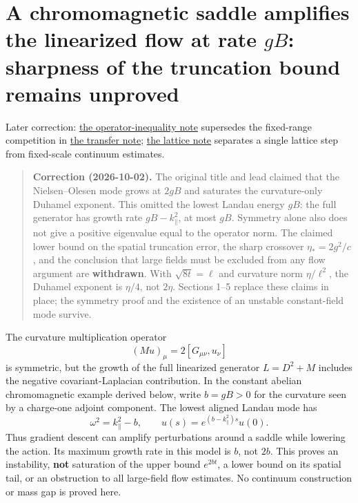 \documentclass[11pt,a4paper]{article}
\begin{document}
\section{\texorpdfstring{A chromomagnetic saddle amplifies the
linearized flow at rate \(gB\): sharpness of the truncation bound
remains
unproved}{A chromomagnetic saddle amplifies the linearized flow at rate gB: sharpness of the truncation bound remains unproved}}\label{a-chromomagnetic-saddle-amplifies-the-linearized-flow-at-rate-gb-sharpness-of-the-truncation-bound-remains-unproved}

Later correction: \href{large-field-operator-inequality.md}{the
operator-inequality note} supersedes the fixed-range competition in
\href{ground-state-measure-transfer.md}{the transfer note};
\href{flow-conjugation-truncation.md}{the lattice note} separates a
single lattice step from fixed-scale continuum estimates.

\begin{quote}
\textbf{Correction (2026-10-02).} The original title and lead claimed
that the Nielsen--Olesen mode grows at \(2gB\) and saturates the
curvature-only Duhamel exponent. This omitted the lowest Landau energy
\(gB\): the full generator has growth rate \(gB-k_\parallel^2\), at most
\(gB\). Symmetry alone also does not give a positive eigenvalue equal to
the operator norm. The claimed lower bound on the spatial truncation
error, the sharp crossover \(\eta_*=2g^2/c\), and the conclusion that
large fields must be excluded from any flow argument are
\textbf{withdrawn}. With \(\sqrt{8t}=\ell\) and curvature norm
\(\eta/\ell^2\), the Duhamel exponent is \(\eta/4\), not \(2\eta\).
Sections 1--5 replace these claims in place; the symmetry proof and the
existence of an unstable constant-field mode survive.
\end{quote}

The curvature multiplication operator \[(Mu)_\mu=2[G_{\mu\nu},u_\nu]\]
is symmetric, but the growth of the full linearized generator
\(L=D^2+M\) includes the negative covariant-Laplacian contribution. In
the constant abelian chromomagnetic example derived below, write
\(b=gB>0\) for the curvature seen by a charge-one adjoint component. The
lowest aligned Landau mode has \[\omega^2=k_\parallel^2-b,\qquad
u(s)=e^{(b-k_\parallel^2)s}u(0).\] Thus gradient descent can amplify
perturbations around a saddle while lowering the action. Its maximum
growth rate in this model is \(b\), not \(2b\). This proves an
instability, \textbf{not} saturation of the upper bound \(e^{2bt}\), a
lower bound on its spatial tail, or an obstruction to all large-field
flow estimates. No continuum construction or mass gap is proved here.
\end{document}
